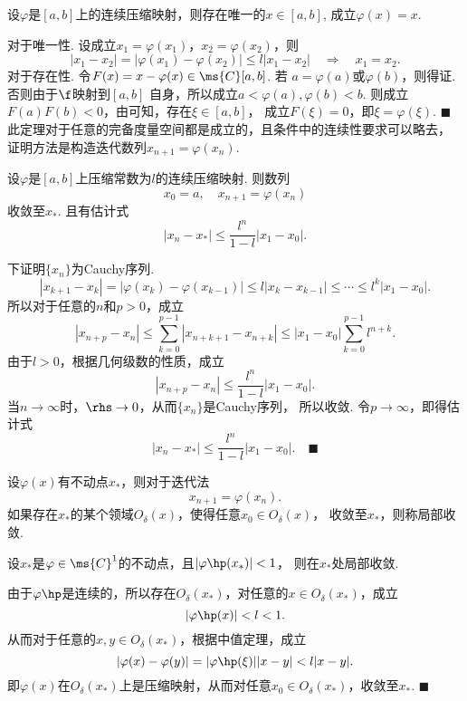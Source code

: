   \begin{thm}[压缩映射定理]
    \label{thm: 压缩映射定理}
    设$\varphi$是$[a,b]$上的连续压缩映射，则存在唯一的$x\in[a, b]$,
    成立$\varphi(x) = x$.
  \end{thm}
  \proof
    对于唯一性. 设成立$x_1=\varphi(x_1)$，$x_2=\varphi(x_2)$，则
    \[
      |x_1-x_2| = |\varphi(x_1)-\varphi(x_2)|\le l|x_1-x_2|
      \quad\Rightarrow\quad x_1=x_2.
    \]
    对于存在性. 令$F(x)=x-\varphi(x)\in\ms{C}[a, b]$. 若
    $a=\varphi(a)$或$\varphi(b)$，则得证. 否则由于$\f$映射到$[a,b]$
    自身，所以成立$a<\varphi(a), \varphi(b)<b$. 则成立
    $F(a)F(b)<0$，由可知，存在$\xi\in[a,b]$，
    成立$F(\xi)=0$，即$\xi=\varphi(\xi)$. $\blacksquare$
  \remark
    此定理对于任意的完备度量空间都是成立的，且条件中的连续性要求可以略去，
    证明方法是构造迭代数列$x_{n+1}=\varphi(x_n)$.

  \begin{thm}[余项估计]
    设$\varphi$是$[a, b]$上压缩常数为$l$的连续压缩映射. 则数列
    \[
      x_0 = a,\quad x_{n+1} = \varphi(x_n)
    \]
    收敛至$x_*$. 且有估计式
    \[
      |x_n - x_*| \le \frac{l^n}{1-l}|x_1-x_0|.
    \]
  \end{thm}
  \proof
    下证明$\{x_n\}$为Cauchy序列.
    \[
      |x_{k+1}-x_k| = |\varphi(x_k) - \varphi(x_{k-1})|
      \le l|x_k-x_{k-1}| \le \cdots \le l^k|x_1-x_0|.
    \]
    所以对于任意的$n$和$p>0$，成立
    \[
      |x_{n+p}-x_n|\le \sum_{k=0}^{p-1} |x_{n+k+1}-x_{n+k}|
      \le |x_1-x_0|\sum_{k=0}^{p-1}l^{n+k}.
    \]
    由于$l>0$，根据几何级数的性质，成立
    \[
      |x_{n+p}-x_n| \le \frac{l^n}{1-l}|x_1-x_0|.
    \]
    当$n\to\infty$时，$\rhs\to 0$，从而$\{x_n\}$是Cauchy序列，
    所以收敛. 令$p\to\infty$，即得估计式
    \[
      |x_n-x_*| \le \frac{l^n}{1-l}|x_1-x_0|.
      \quad\blacksquare
    \]

  \begin{defi}[局部收敛]
    设$\varphi(x)$有不动点$x_*$，则对于迭代法
    \begin{equation}
      \label{equ: 迭代法}
      x_{n+1}=\varphi(x_n).
    \end{equation}
    如果存在$x_*$的某个领域$O_\delta(x)$，使得任意$x_0\in O_\delta(x)$，
    收敛至$x_*$，则称局部收敛.
  \end{defi}

  \begin{thm}[局部收敛的条件]
    设$x_*$是$\varphi\in\ms{C}^1$的不动点，且$|\varphi\hp(x_*)|<1$，
    则在$x_*$处局部收敛.
  \end{thm}
  \proof
    由于$\varphi\hp$是连续的，所以存在$O_\delta(x_*)$，对任意的$x\in
    O_\delta(x_*)$，成立
    \[
      |\varphi\hp(x)| < l < 1.
    \]
    从而对于任意的$x,y\in O_\delta(x_*)$，根据中值定理，成立
    \[
      |\varphi(x) - \varphi(y)| = |\varphi\hp(\xi)||x-y| < l|x-y|.
    \]
    即$\varphi(x)$在$O_\delta(x_*)$上是压缩映射，从而对任意$x_0\in
    O_\delta(x_*)$，收敛至$x_*$. $\blacksquare$


